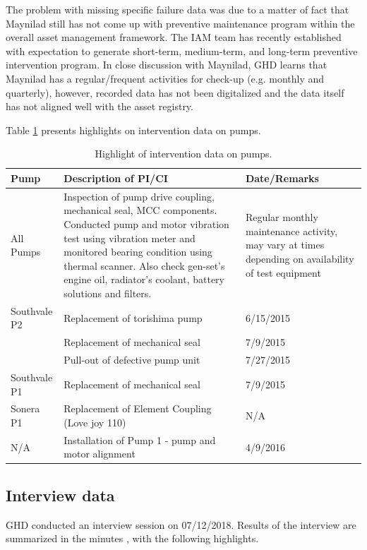 The problem with missing specific failure data was due to a matter of fact that Maynilad still has not come up with preventive maintenance program within the overall asset management framework. The IAM team has recently established with expectation to generate short-term, medium-term, and long-term preventive intervention program. In close discussion with Maynilad, GHD learns that Maynilad has a regular/frequent activities for check-up (e.g. monthly and quarterly), however, recorded data has not been digitalized and the data itself has not aligned well with the asset registry. 

Table \ref{interventiondata} presents highlights on intervention data on pumps.

\begin{table}[h]
	\caption{Highlight of intervention data on pumps.}
	\label{interventiondata}
	{\footnotesize
		\begin{tabular}{l|p{6cm}|p{4cm}}
			
			\hline
			Pump & Description of PI/CI & Date/Remarks \\ 
			\hline
			All Pumps & Inspection of pump drive coupling, mechanical seal, MCC components. Conducted pump and motor vibration test using vibration meter and monitored bearing condition using thermal scanner. Also check gen-set's engine oil, radiator's coolant, battery solutions and filters. & Regular monthly maintenance activity, may vary at times depending on availability of test equipment \\ 
			Southvale P2 & Replacement of torishima pump & 6/15/2015 \\ 
			& Replacement of mechanical seal & 7/9/2015 \\ 
			& Pull-out of defective pump unit & 7/27/2015 \\ 
			Southvale P1 & Replacement of mechanical seal & 7/9/2015 \\ 
			Sonera P1 & Replacement of Element Coupling (Love joy 110) & N/A \\ 
			N/A & Installation of Pump 1 - pump and motor alignment & 4/9/2016 \\ 
			\hline
			
		\end{tabular}
		
	}
\end{table}



\subsection{Interview data}
\label{213}
GHD conducted an interview session on 07/12/2018. Results of the interview are summarized in the minutes \cite{GHD2018l}, with the following highlights.

